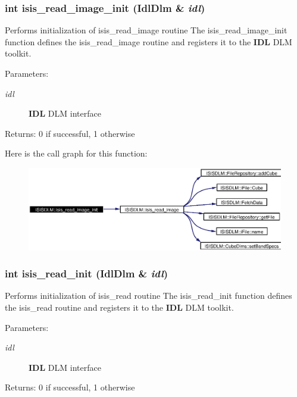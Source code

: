 \subsubsection{\setlength{\rightskip}{0pt plus 5cm}int isis\_\-read\_\-image\_\-init (Idl\-Dlm \& {\em idl})}\label{namespaceISISDLM_a32}


Performs initialization of isis\_\-read\_\-image routine The isis\_\-read\_\-image\_\-init function defines the isis\_\-read\_\-image routine and registers it to the {\bf IDL} DLM toolkit. \begin{Desc}
\item[Parameters:]
\begin{description}
\item[{\em idl}]{\bf IDL} DLM interface \end{description}
\end{Desc}
\begin{Desc}
\item[Returns:]0 if successful, 1 otherwise \end{Desc}


Here is the call graph for this function:\begin{figure}[H]
\begin{center}
\leavevmode
\includegraphics[width=376pt]{namespaceISISDLM_a32_cgraph}
\end{center}
\end{figure}
\subsubsection{\setlength{\rightskip}{0pt plus 5cm}int isis\_\-read\_\-init (Idl\-Dlm \& {\em idl})}\label{namespaceISISDLM_a26}


Performs initialization of isis\_\-read routine The isis\_\-read\_\-init function defines the isis\_\-read routine and registers it to the {\bf IDL} DLM toolkit. \begin{Desc}
\item[Parameters:]
\begin{description}
\item[{\em idl}]{\bf IDL} DLM interface \end{description}
\end{Desc}
\begin{Desc}
\item[Returns:]0 if successful, 1 otherwise \end{Desc}


